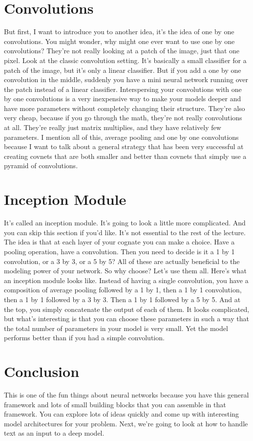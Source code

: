 \documentclass{article}
\begin{document}
\section{Convolutions}
But first,
I want to introduce you to another idea,
it's the idea of one
by one convolutions.
You might wonder, why might one ever
want to use one by one convolutions?
They're not really looking at a patch
of the image, just that one pixel.
Look at the classic convolution setting.
It's basically a small classifier for
a patch of the image, but
it's only a linear classifier.
But if you add a one by one convolution
in the middle, suddenly you have
a mini neural network running over the
patch instead of a linear classifier.
Interspersing your convolutions
with one by one convolutions
is a very inexpensive way to
make your models deeper and
have more parameters without
completely changing their structure.
They're also very cheap,
because if you go through the math,
they're not really convolutions at all.
They're really just matrix multiplies,
and they have relatively few parameters.
I mention all of this, average pooling
and one by one convolutions because I
want to talk about a general strategy
that has been very successful at
creating covnets that
are both smaller and
better than covnets that simply
use a pyramid of convolutions.
\section{Inception Module}
It's called an inception module.
It's going to look
a little more complicated.
And you can skip this
section if you'd like.
It's not essential to
the rest of the lecture.
The idea is that at each layer of
your cognate you can make a choice.
Have a pooling operation,
have a convolution.
Then you need to decide is it a 1 by 1
convolution, or a 3 by 3, or a 5 by 5?
All of these are actually beneficial
to the modeling power of your network.
So why choose?
Let's use them all.
Here's what an inception
module looks like.
Instead of having a single convolution,
you have a composition of average
pooling followed by a 1 by 1,
then a 1 by 1 convolution,
then a 1 by 1 followed by a 3 by 3.
Then a 1 by 1 followed by a 5 by 5.
And at the top, you simply concatenate
the output of each of them.
It looks complicated, but
what's interesting is that you can
choose these parameters in such a way
that the total number of parameters
in your model is very small.
Yet the model performs better than
if you had a simple convolution.
\section{Conclusion}
This is one of the fun things about
neural networks because you have
this general framework and
lots of small building blocks that
you can assemble in that framework.
You can explore lots
of ideas quickly and
come up with interesting model
architectures for your problem.
Next, we're going to look at how to
handle text as an input to a deep model.
\end{document}
